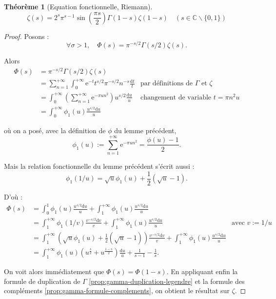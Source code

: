 \documentclass[french]{report}
\newtheorem{theorem}{Théorème}[section]
\begin{document}
\begin{theorem}[Equation fonctionnelle, Riemann]\label{thm:equation-fonctionnelle}
  \[ \zeta(s) = 2^s\pi^{s-1}\sin\left(\frac{\pi s}{2}\right)\Gamma(1-s)\zeta(1-s)\quad (s\in\mathbb{C}\backslash\{0,1\}) \]
\end{theorem}

\begin{proof}
  Posons :
  \[
    \forall\sigma>1,\quad
    \Phi(s)=\pi^{-s/2}\Gamma(s/2)\zeta(s).
  \]

  Alors
  \begin{align*}
    \Phi(s)
    &= \pi^{-s/2}\Gamma(s/2)\zeta(s) & \\
    &= \sum_{n=1}^{+\infty}\int_0^{+\infty}\mathrm{e}^{-t}t^{s/2}\pi^{-s/2}n^{-s}\frac{\mathrm{d}t}{t}
    & \text{par définitions de $\Gamma$ et $\zeta$} \\
    &= \int_0^{+\infty}\left(\sum_{n=1}^{+\infty}\mathrm{e}^{-\pi un^2}\right)u^{s/2}\frac{\mathrm{d}u}{u}
    & \text{changement de variable $t=\pi n^2u$} \\
    &= \int_0^{+\infty}\phi_1(u)\frac{u^{s/2}\mathrm{d}u}{u}
  \end{align*}

  où on a posé, avec la définition de $\phi$ du lemme précédent,
  \[
    \phi_1(u)
    :=\sum_{n=1}^{+\infty}\mathrm{e}^{-\pi un^2}
    = \frac{\phi(u)-1}{2}.
  \]

  Mais la relation fonctionnelle du lemme précédent s'écrit aussi :
  \[
    \phi_1(1/u)=\sqrt{u}\phi_1(u)+\frac{1}{2}(\sqrt{u}-1).
  \]

  D'où :
  \begin{align}
    \Phi(s)
    &= \int_0^1\phi_1(u)\frac{u^{s/2}\mathrm{d}u}{u} + \int_1^{+\infty}\phi_1(u)\frac{u^{s/2}\mathrm{d}u}{u}
    & \\
    &= \int_1^{+\infty}\phi_1(1/v)\frac{v^{-s/2}\mathrm{d}v}{v} + \int_1^{+\infty}\phi_1(u)\frac{u^{s/2}\mathrm{d}u}{u}
    & \text{avec $v:=1/u$} \\
    &= \int_1^{+\infty}\left(\sqrt{u}\phi_1(u)+\frac{1}{2}(\sqrt{u}-1)\right)\frac{v^{-s/2}\mathrm{d}v}{v} + \int_1^{+\infty}\phi_1(u)\frac{u^{s/2}\mathrm{d}u}{u}
    & \\
    &= \int_1^{+\infty}\phi_1(u)\left(u^{\frac{s}{2}}+u^{\frac{1-s}{2}}\right)\frac{\mathrm{d}u}{u} + \frac{1}{s-1}-\frac{1}{s}.\label{eq:phi-avec-phi-1}
  \end{align}

  On voit alors immédiatement que $\Phi(s)=\Phi(1-s)$. En appliquant enfin la formule de duplication de $\Gamma$ \ref{prop:gamma-duplication-legendre} et la formule des compléments \ref{prop:gamma-formule-complements}, on obtient le résultat sur $\zeta$.
\end{proof}
\end{document}
